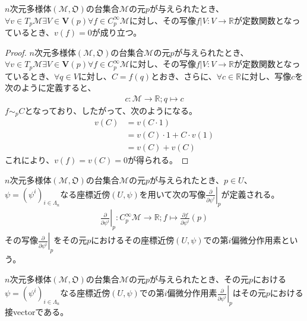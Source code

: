 \documentclass[dvipdfmx]{jsarticle}
\begin{document}
\begin{thm}\label{8.3.3.8}
  $n$次元多様体$\left(\mathcal{M},\mathfrak{O}\right)$の台集合$\mathcal{M}$の元$p$が与えられたとき、$\forall v\in T_p \mathcal{M} \exists V\in \mathbf{V} \left(p\right) \forall f\in C^\infty_p \mathcal{M}$に対し、その写像$f|V:V\rightarrow \mathbb{R}$が定数関数となっているとき、$v\left(f\right)=0$が成り立つ。
\end{thm}
\begin{proof}
  $n$次元多様体$\left(\mathcal{M},\mathfrak{O}\right)$の台集合$\mathcal{M}$の元$p$が与えられたとき、$\forall v\in T_p \mathcal{M} \exists V\in \mathbf{V} \left(p\right) \forall f\in C^\infty_p \mathcal{M}$に対し、その写像$f|V:V\rightarrow \mathbb{R}$が定数関数となっているとき、$\forall q\in V$に対し、$C=f\left(q\right)$とおき、さらに、$\forall c\in \mathbb{R}$に対し、写像$c$を次のように定義すると、
  \begin{align*}
    c:\mathcal{M} \rightarrow \mathbb{R} ;q\mapsto c
  \end{align*}
  $f\sim_p C$となっており、したがって、次のようになる。
  \begin{align*}
    v\left(C\right) &=v\left(C\cdot 1\right) \\
    &=v\left(C\right) \cdot 1+C\cdot v\left(1\right) \\
    &=v\left(C\right) +v\left(C\right)
  \end{align*}
  これにより、$v\left(f\right)=v\left(C\right)=0$が得られる。
\end{proof}
\begin{dfn}
  $n$次元多様体$\left(\mathcal{M},\mathfrak{O}\right)$の台集合$\mathcal{M}$の元$p$が与えられたとき、$p\in U$、$\psi =\left(\psi^i \right)_{i\in \varLambda_n }$なる座標近傍$\left(U,\psi\right)$を用いて次の写像$\left. \frac{\partial}{\partial \psi^i }\right|_p $が定義される。
  \begin{align*}
    \left. \frac{\partial}{\partial \psi^i }\right|_p :C^\infty_p \mathcal{M} \rightarrow \mathbb{R} ;f\mapsto \frac{\partial f}{\partial \psi^i } \left(p\right)
  \end{align*}
  その写像$\left. \frac{\partial}{\partial \psi^i }\right|_p $をその元$p$におけるその座標近傍$\left(U,\psi\right)$での第$i$偏微分作用素という。
\end{dfn}
\begin{thm}\label{8.3.3.9}
  $n$次元多様体$\left(\mathcal{M},\mathfrak{O}\right)$の台集合$\mathcal{M}$の元$p$が与えられたとき、その元$p$における$\psi =\left(\psi^i \right)_{i\in \varLambda_n }$なる座標近傍$\left(U,\psi\right)$での第$i$偏微分作用素$\left. \frac{\partial}{\partial \psi^i }\right|_p $はその元$p$における接vectorである。
\end{thm}
\end{document}
